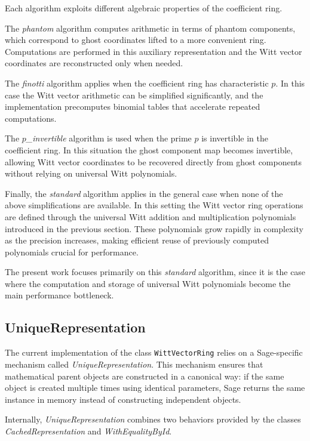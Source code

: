 \documentclass[oneside, a4paper, onecolumn, 11pt]{article}
\theoremstyle{definition}
\begin{document}
Each algorithm exploits different algebraic properties of the coefficient ring.

The \emph{phantom} algorithm computes arithmetic in terms of phantom components, which correspond to ghost coordinates lifted to a more convenient ring. Computations are performed in this auxiliary representation and the Witt vector coordinates are reconstructed only when needed.

The \emph{finotti} algorithm applies when the coefficient ring has characteristic $p$. In this case the Witt vector arithmetic can be simplified significantly, and the implementation precomputes binomial tables that accelerate repeated computations.

The \emph{$p$\_invertible} algorithm is used when the prime $p$ is invertible in the coefficient ring. In this situation the ghost component map becomes invertible, allowing Witt vector coordinates to be recovered directly from ghost components without relying on universal Witt polynomials.

Finally, the \emph{standard} algorithm applies in the general case when none of the above simplifications are available. In this setting the Witt vector ring operations are defined through the universal Witt addition and multiplication polynomials introduced in the previous section. These polynomials grow rapidly in complexity as the precision increases, making efficient reuse of previously computed polynomials crucial for performance.

The present work focuses primarily on this \emph{standard} algorithm, since it is the case where the computation and storage of universal Witt polynomials become the main performance bottleneck.


\subsection{UniqueRepresentation}

The current implementation of the class \texttt{WittVectorRing} relies on a Sage-specific mechanism called \emph{UniqueRepresentation}. This mechanism ensures that mathematical parent objects are constructed in a canonical way: if the same object is created multiple times using identical parameters, Sage returns the same instance in memory instead of constructing independent objects.

Internally, \emph{UniqueRepresentation} combines two behaviors provided by the classes \emph{CachedRepresentation} and \emph{WithEqualityById}.
\end{document}
